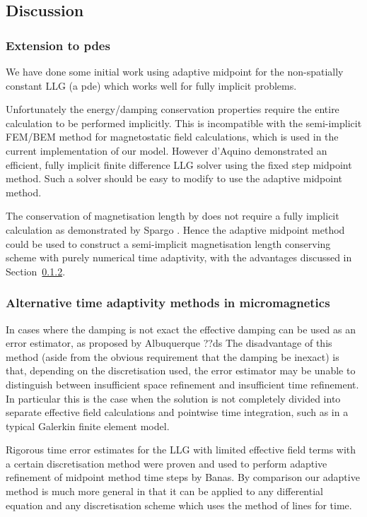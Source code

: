 \subsection{Discussion}

\subsubsection{Extension to pdes}

We have done some initial work using adaptive midpoint for the non-spatially constant LLG (\ie a pde) which works well for fully implicit problems.

Unfortunately the energy/damping conservation properties require the entire calculation to be performed implicitly.
This is incompatible with the semi-implicit FEM/BEM method for magnetostatic field calculations,\cite{Koehler1997} which is used in the current implementation of our model.
However d'Aquino \etal demonstrated an efficient, fully implicit finite difference LLG solver using the fixed step midpoint method\cite{DAquino2005}.
Such a solver should be easy to modify to use the adaptive midpoint method.

The conservation of magnetisation length by \imr does not require a fully implicit calculation as demonstrated by Spargo \etal\cite{Spargo2003a}.
Hence the adaptive midpoint method could be used to construct a semi-implicit magnetisation length conserving scheme with purely numerical time adaptivity, with the advantages discussed in Section~\ref{sec:altern-time-adapt}.


\subsubsection{Alternative time adaptivity methods in micromagnetics}
\label{sec:altern-time-adapt}

In cases where the damping is not exact the effective damping can be used as an error estimator, as proposed by Albuquerque \etal\cite{Albuquerque2001}
??ds The disadvantage of this method (aside from the obvious requirement that the damping be inexact) is that, depending on the discretisation used, the error estimator may be unable to distinguish between insufficient space refinement and insufficient time refinement.
In particular this is the case when the solution is not completely divided into separate effective field calculations and pointwise time integration, such as in a typical Galerkin finite element model.

Rigorous time error estimates for the LLG with limited effective field terms with a certain discretisation method were proven and used to perform adaptive refinement of midpoint method time steps by Banas.\cite{Banas-thesis}
By comparison our adaptive method is much more general in that it can be applied to any differential equation and any discretisation scheme which uses the method of lines for time.

